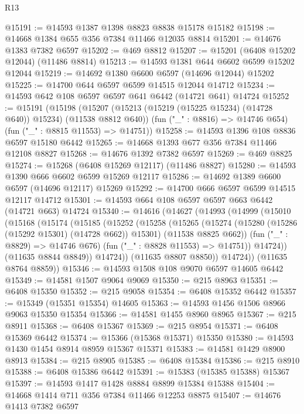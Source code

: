 \begin{lexlean}{R13}
\begin{coremodule}
@15191 := @14593 @1387 @1398 @8823 @8838 @15178 @15182
@15198 := @14668 @1384 @655 @356 @7384 @11466 @12035 @8814
@15201 := @14676 @1383 @7382 @6597
@15202 := @469 @8812
@15207 := @15201 (@6408 @15202 @12044) (@11486 @8814)
@15213 := @14593 @1381 @644 @6602 @6599 @15202 @12044
@15219 := @14692 @1380 @6600 @6597 (@14696 @12044) @15202
@15225 := @14700 @644 @6597 @6599 @14515 @12044 @14712
@15234 := @14593 @642 @108 @6597 @6597 @641 @6442 (@14721 @641) @14724
@15252 := @15191
    (@15198
      (@15207 (@15213 (@15219 (@15225 @15234) (@14728 @640)) @15234) (@11538 @8812 @640))
      (fun ("_" : @8816) => @14746 @654)
      (fun ("_" : @8815 @11553) => @14751))
@15258 := @14593 @1396 @108 @8836 @6597 @15180 @6442
@15265 := @14668 @1393 @677 @356 @7384 @11466 @12108 @8827
@15268 := @14676 @1392 @7382 @6597
@15269 := @469 @8825
@15274 := @15268 (@6408 @15269 @12117) (@11486 @8827)
@15280 := @14593 @1390 @666 @6602 @6599 @15269 @12117
@15286 := @14692 @1389 @6600 @6597 (@14696 @12117) @15269
@15292 := @14700 @666 @6597 @6599 @14515 @12117 @14712
@15301 := @14593 @664 @108 @6597 @6597 @663 @6442 (@14721 @663) @14724
@15340 := @14616
    (@14627
      (@14993
        (@14999
          (@15010
            (@15168
              (@15174
                (@15185
                  (@15252
                    (@15258
                      (@15265
                        (@15274
                          (@15280 (@15286 (@15292 @15301) (@14728 @662)) @15301)
                          (@11538 @8825 @662))
                        (fun ("_" : @8829) => @14746 @676)
                        (fun ("_" : @8828 @11553) => @14751))
                      @14724))
                  (@11635 @8844 @8849))
                @14724))
            (@11635 @8807 @8850))
          @14724))
      (@11635 @8764 @8859))
@15346 := @14593 @1508 @108 @9070 @6597 @14605 @6442
@15349 := @14581 @1507 @9064 @9069
@15350 := @215 @8963
@15351 := @6408 @15350
@15352 := @215 @9058
@15354 := @6408 @15352 @6442
@15357 := @15349 (@15351 @15354) @14605
@15363 := @14593 @1456 @1506 @8966 @9063 @15350 @15354
@15366 := @14581 @1455 @8960 @8965
@15367 := @215 @8911
@15368 := @6408 @15367
@15369 := @215 @8954
@15371 := @6408 @15369 @6442
@15374 := @15366 (@15368 @15371) @15350
@15380 := @14593 @1430 @1454 @8914 @8959 @15367 @15371
@15383 := @14581 @1429 @8900 @8913
@15384 := @215 @8905
@15385 := @6408 @15384
@15386 := @215 @8910
@15388 := @6408 @15386 @6442
@15391 := @15383 (@15385 @15388) @15367
@15397 := @14593 @1417 @1428 @8884 @8899 @15384 @15388
@15404 := @14668 @1414 @711 @356 @7384 @11466 @12253 @8875
@15407 := @14676 @1413 @7382 @6597

\end{coremodule}
\end{lexlean}
